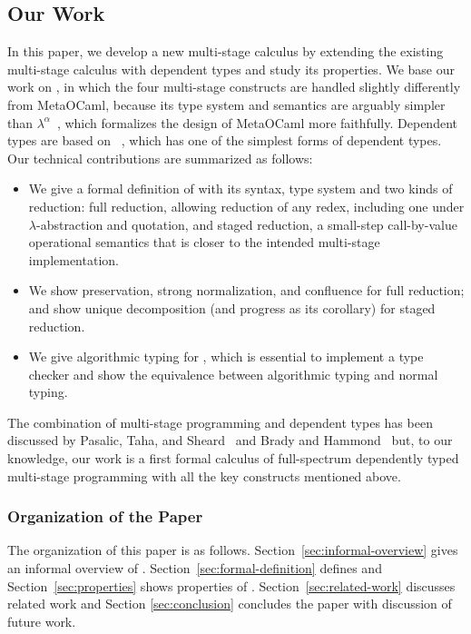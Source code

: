 \subsection{Our Work}
In this paper, we develop a new multi-stage calculus \LMD by extending the
existing multi-stage calculus \LTP\cite{HanadaIgarashi2014CSP} with dependent types and
study its properties.  We base our work on \LTP, in which the four multi-stage
constructs are handled slightly differently from MetaOCaml, because its type
system and semantics are arguably simpler than
\(\lambda^\alpha\)~\cite{TahaNielsen2003Environment}, which formalizes the design of
MetaOCaml more faithfully.  Dependent types are based on \LLF~\cite{benjamin2005attapldependent},
which has one of the simplest forms of dependent types.  Our technical
contributions are summarized as follows:
\begin{itemize}
    \item We give a formal definition of \LMD with its syntax, type system and
        two kinds of reduction: full reduction, allowing reduction of any redex,
        including one under $\lambda$-abstraction and quotation, and staged reduction, a
        small-step call-by-value operational semantics that is closer to the intended
        multi-stage implementation.
    \item We show preservation, strong normalization, and confluence for full
        reduction; and show unique decomposition (and progress as its
        corollary) for staged reduction.
    \item We give algorithmic typing for \LMD, which is essential to implement
        a type checker and show the equivalence between algorithmic typing and
        normal typing.
\end{itemize}
The combination of multi-stage programming and dependent types has been
discussed by Pasalic, Taha, and Sheard~\cite{PasalicTahaSheard2002Tagless} and Brady and
Hammond~\cite{BradyHammond2006Dependently} but, to our knowledge, our work is a first
formal calculus of full-spectrum dependently typed multi-stage programming with
all the key constructs mentioned above.

\subsubsection{Organization of the Paper}

The organization of this paper is as follows.
Section~\ref{sec:informal-overview} gives an informal overview of
\LMD. Section~\ref{sec:formal-definition} defines \LMD and
Section~\ref{sec:properties} shows properties of \LMD.
Section~\ref{sec:related-work} discusses related work and Section
\ref{sec:conclusion} concludes the paper with discussion of future
work.
